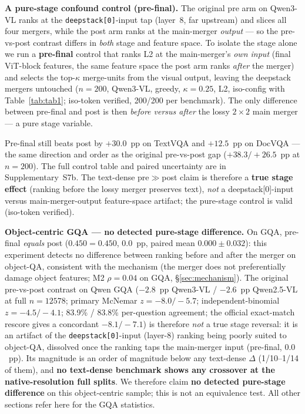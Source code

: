 \documentclass[journal]{IEEEtran}
\begin{document}
\textbf{A pure-stage confound control (pre-final).} The original pre arm on
Qwen3-VL ranks at the \texttt{deepstack[0]}-input tap (layer~8, far upstream)
and slices all four mergers, while the post arm ranks at the main-merger
\emph{output} --- so the pre-vs-post contrast differs in \emph{both} stage and
feature space. To isolate the stage alone we run a \textbf{pre-final} control
that ranks L2 at the main-merger's \emph{own input} (final ViT-block features,
the same feature space the post arm ranks \emph{after} the merger) and selects
the top-$\kappa$ merge-units from the visual output, leaving the deepstack
mergers untouched ($n = 200$, Qwen3-VL, greedy, $\kappa = 0.25$, L2, iso-config
with Table~\ref{tab:tab1}; iso-token verified, 200/200 per benchmark). The only
difference between pre-final and post is then \emph{before versus after} the
lossy $2\!\times\!2$ main merger --- a pure stage variable.

Pre-final still beats post by $+30.0$~pp on TextVQA and $+12.5$~pp on DocVQA ---
the same direction and order as the original pre-vs-post gap
($+38.3 / +26.5$~pp at $n = 200$). The full control table and paired
uncertainty are in Supplementary~S7b. The text-dense
pre$\gg$post claim is therefore a \textbf{true stage effect} (ranking before
the lossy merger preserves text), \emph{not} a deepstack[0]-input versus
main-merger-output feature-space artifact; the pure-stage control is valid
(iso-token verified).

\textbf{Object-centric GQA --- no detected pure-stage difference.} On
GQA, pre-final \emph{equals} post ($0.450 = 0.450$, $0.0$~pp, paired mean
$0.000 \pm 0.032$): this experiment detects no difference between ranking
before and after the merger on object-QA, consistent with the mechanism (the merger does not
preferentially damage object features; M2 $\rho = 0.04$ on GQA,
\S\ref{sec:mechanism}). The original pre-vs-post contrast on Qwen GQA
($-2.8$~pp Qwen3-VL / $-2.6$~pp Qwen2.5-VL at full $n = 12578$; primary
McNemar $z = -8.0 / -5.7$; independent-binomial $z = -4.5 / -4.1$; 83.9\% /
83.8\% per-question agreement; the official exact-match rescore gives a
concordant $-8.1 / -7.1$) is therefore \emph{not} a true stage reversal: it is an
artifact of the \texttt{deepstack[0]}-input (layer-8) ranking being poorly
suited to object-QA, dissolved once the ranking taps the main-merger input
(pre-final, $0.0$~pp). Its magnitude is an order of magnitude below any
text-dense $\Delta$ (1/10--1/14 of them), and \textbf{no text-dense benchmark
shows any crossover at the native-resolution full splits}. We therefore claim
\textbf{no detected pure-stage difference} on this object-centric sample; this
is not an equivalence test. All other sections refer here for the GQA statistics.
\end{document}
